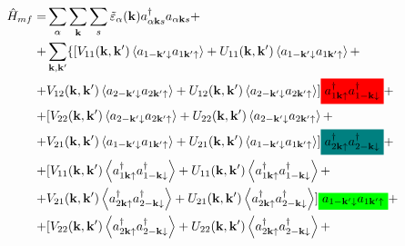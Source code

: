 \documentclass[class=article, crop=false]{standalone}
\newcommand{\mathcolorbox}[2]{\colorbox{#1}{$\displaystyle #2$}}
\begin{document}
\begin{equation} \label{key}
	\begin{split}
		\hat{H}_{mf} = & \sum_{ \alpha} \sum_{ \mathbf{k}} \sum_{s} \tilde{ \varepsilon}_{ \alpha} ( \mathbf{k}) a^{ \dagger}_{ \alpha \mathbf{k} s} a_{ \alpha \mathbf{k} s} + \\
		+ & \sum_{ \mathbf{k}, \mathbf{k}'} \lbrace [ V_{ 1 1} ( \mathbf{k}, \mathbf{k}') \left\langle a_{ 1 -\mathbf{k}' \downarrow} a_{ 1 \mathbf{k}' \uparrow} \right\rangle + U_{ 1 1} ( \mathbf{k}, \mathbf{k}') \left\langle a_{ 1 -\mathbf{k}' \downarrow} a_{ 1 \mathbf{k}' \uparrow} \right\rangle + \\
		+ & V_{ 1 2} ( \mathbf{k}, \mathbf{k}') \left\langle a_{ 2 -\mathbf{k}' \downarrow} a_{ 2 \mathbf{k}' \uparrow} \right\rangle + U_{ 1 2} ( \mathbf{k}, \mathbf{k}') \left\langle a_{ 2 -\mathbf{k}' \downarrow} a_{ 2 \mathbf{k}' \uparrow} \right\rangle ] \mathcolorbox{red}{a^{ \dagger}_{ 1 \mathbf{k} \uparrow} a^{ \dagger}_{ 1 -\mathbf{k} \downarrow}} + \\
		+ & [ V_{ 2 2} ( \mathbf{k}, \mathbf{k}') \left\langle a_{ 2 -\mathbf{k}' \downarrow} a_{ 2 \mathbf{k}' \uparrow} \right\rangle  + U_{ 2 2} ( \mathbf{k}, \mathbf{k}') \left\langle a_{ 2 -\mathbf{k}' \downarrow} a_{ 2 \mathbf{k}' \uparrow} \right\rangle + \\
		+ & V_{ 2 1} ( \mathbf{k}, \mathbf{k}') \left\langle a_{ 1 -\mathbf{k}' \downarrow} a_{ 1 \mathbf{k}' \uparrow} \right\rangle + U_{ 2 1} ( \mathbf{k}, \mathbf{k}') \left\langle a_{ 1 -\mathbf{k}' \downarrow} a_{ 1 \mathbf{k}' \uparrow} \right\rangle ] \mathcolorbox{teal}{a^{ \dagger}_{ 2 \mathbf{k} \uparrow} a^{ \dagger}_{ 2 -\mathbf{k} \downarrow}} + \\
		+ &	[ V_{ 1 1} ( \mathbf{k}, \mathbf{k}') \left\langle a^{ \dagger}_{ 1 \mathbf{k} \uparrow} a^{ \dagger}_{ 1 -\mathbf{k} \downarrow} \right\rangle + U_{ 1 1} ( \mathbf{k}, \mathbf{k}') \left\langle a^{ \dagger}_{ 1 \mathbf{k} \uparrow} a^{ \dagger}_{ 1 -\mathbf{k} \downarrow} \right\rangle + \\
		+ & V_{ 2 1} ( \mathbf{k}, \mathbf{k}') \left\langle a^{ \dagger}_{ 2 \mathbf{k} \uparrow} a^{ \dagger}_{ 2 -\mathbf{k} \downarrow} \right\rangle + U_{ 2 1} ( \mathbf{k}, \mathbf{k}') \left\langle a^{ \dagger}_{ 2 \mathbf{k} \uparrow} a^{ \dagger}_{ 2 -\mathbf{k} \downarrow} \right\rangle ] \mathcolorbox{green}{a_{ 1 -\mathbf{k}' \downarrow} a_{ 1 \mathbf{k}' \uparrow}} + \\
		+ & [ V_{ 2 2} ( \mathbf{k}, \mathbf{k}') \left\langle a^{ \dagger}_{ 2 \mathbf{k} \uparrow} a^{ \dagger}_{ 2 -\mathbf{k} \downarrow} \right\rangle + U_{ 2 2} ( \mathbf{k}, \mathbf{k}') \left\langle a^{ \dagger}_{ 2 \mathbf{k} \uparrow} a^{ \dagger}_{ 2 -\mathbf{k} \downarrow} \right\rangle + \\

\end{split}
\end{equation}
\end{document}
